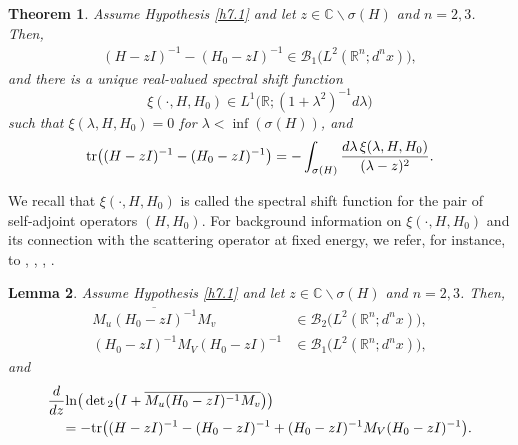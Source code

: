 \documentclass[reqno,10pt, centertags]{amsart}
\newcommand{\bbR}{{\mathbb{R}}}
\newcommand{\bbC}{{\mathbb{C}}}
\newcommand{\cB}{{\mathcal B}}
\newcommand{\lb}{\label}
\newcommand{\ol}{\overline}
\newcommand{\la}{\lambda}
\newcommand{\si}{\sigma}
\newcommand{\tr}{\text{\rm{tr}}}
\renewcommand{\ln}{\text{\rm ln}}
\numberwithin{equation}{section}
\newtheorem{theorem}{Theorem}[section]
\newtheorem{lemma}[theorem]{Lemma}
\theoremstyle{definition}
\begin{document}
\begin{theorem} \lb{t7.2}
Assume Hypothesis \ref{h7.1} and let $z\in\bbC\backslash\si(H)$ and
$n=2,3$. Then,
\begin{align}
(H-zI)^{-1} - (H_0-zI)^{-1} \in\cB_1\big(L^2(\bbR^n;d^nx)\big),  \lb{7.5}
\end{align}
and there is a unique real-valued spectral shift function
\begin{equation}
\xi(\cdot,H,H_0)\in L^1\big(\bbR; (1+\la^2)^{-1}d\la)   \lb{7.6}
\end{equation}
such that $\xi(\la,H,H_0)=0$ for $\la< \inf (\sigma(H))$, and
\begin{align}
\tr\big((H-zI)^{-1} - (H_0-zI)^{-1}\big) = - \int_{\sigma(H)}
\frac{d\la\,\xi(\la,H,H_0)}{(\la-z)^2}.   \lb{7.7}
\end{align}
\end{theorem}

We recall that $\xi(\cdot,H,H_0)$ is called the spectral shift function
for the pair of self-adjoint operators $(H,H_0)$. For background
information on $\xi(\cdot,H,H_0)$ and its connection with the scattering
operator at fixed energy, we refer, for instance, to \cite[Sect.\
19.1]{BW83}, \cite{BK62}, \cite{BY93}, \cite[Ch.\ 8]{Ya92}.

\begin{lemma}  \lb{l7.3}
Assume Hypothesis \ref{h7.1} and let $z\in\bbC\backslash\si(H)$ and
$n=2,3$. Then,
\begin{align}
 \ol{M_u(H_0-zI)^{-1}M_v} &\in\cB_2\big(L^2(\bbR^n;d^nx)\big),  \lb{7.8}
\\
 (H_0-zI)^{-1}M_V(H_0-zI)^{-1}
& \in\cB_1\big(L^2(\bbR^n;d^nx)\big),   \lb{7.9}
\end{align}
and
\begin{align}
\begin{split}
&\frac{d}{dz}\ln\big(\det{}_2\big(I+\ol{M_u(H_0-zI)^{-1}M_v}\big)\big)
\\
&\quad = -\tr\big((H-zI)^{-1} - (H_0-zI)^{-1} +
(H_0-zI)^{-1}M_V(H_0-zI)^{-1}\big).   \lb{7.10}
\end{split}
\end{align}
\end{lemma}
\end{document}
